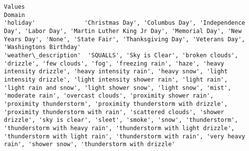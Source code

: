\documentclass[11pt]{article}
\begin{document}
    \begin{Verbatim}[commandchars=\\\{\}]
                                                                                                                                                                                                                                                                                                                                                                                                                                                                                                                                                                                                                                                                                                                                                                                             Values
Domain                                                                                                                                                                                                                                                                                                                                                                                                                                                                                                                                                                                                                                                                                                                                                                                             
'holiday'              'Christmas Day', 'Columbus Day', 'Independence Day', 'Labor Day', 'Martin Luther King Jr Day', 'Memorial Day', 'New Years Day', 'None', 'State Fair', 'Thanksgiving Day', 'Veterans Day', 'Washingtons Birthday'                                                                                                                                                                                                                                                                                                                                                                                                                                                                                                                                                            
'weather\_description'  'SQUALLS', 'Sky is Clear', 'broken clouds', 'drizzle', 'few clouds', 'fog', 'freezing rain', 'haze', 'heavy intensity drizzle', 'heavy intensity rain', 'heavy snow', 'light intensity drizzle', 'light intensity shower rain', 'light rain', 'light rain and snow', 'light shower snow', 'light snow', 'mist', 'moderate rain', 'overcast clouds', 'proximity shower rain', 'proximity thunderstorm', 'proximity thunderstorm with drizzle', 'proximity thunderstorm with rain', 'scattered clouds', 'shower drizzle', 'sky is clear', 'sleet', 'smoke', 'snow', 'thunderstorm', 'thunderstorm with heavy rain', 'thunderstorm with light drizzle', 'thunderstorm with light rain', 'thunderstorm with rain', 'very heavy rain', 'shower snow', 'thunderstorm with drizzle'

\end{Verbatim}
\end{document}
